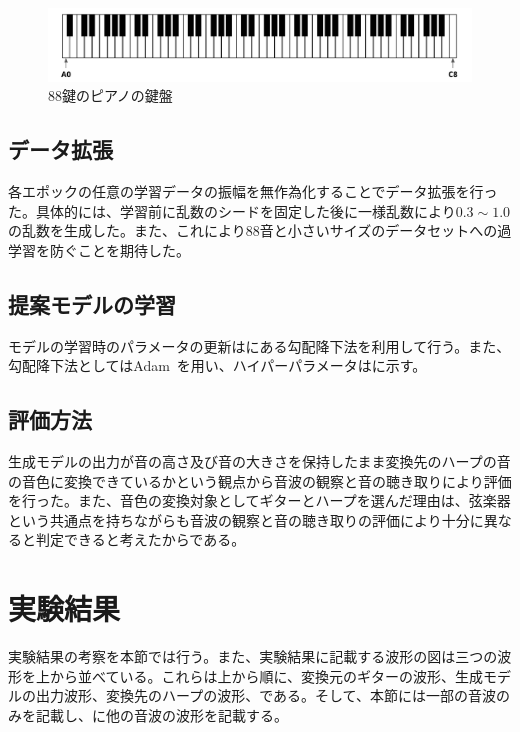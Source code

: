 \begin{figure}[b]
\centering
\includegraphics[width=0.7\columnwidth]{figure/piano.png}
\caption{88鍵のピアノの鍵盤}
\label{fig:piano}
\end{figure}

\clearpage

\subsection{データ拡張}

各エポックの任意の学習データの振幅を無作為化することでデータ拡張を行った。具体的には、学習前に乱数のシードを固定した後に一様乱数により$0.3\sim1.0$の乱数を生成した。また、これにより88音と小さいサイズのデータセットへの過学習を防ぐことを期待した。

\subsection{提案モデルの学習}

モデルの学習時のパラメータの更新はにある勾配降下法を利用して行う。また、勾配降下法としてはAdam~\cite{Adam}を用い、ハイパーパラメータはに示す。

\subsection{評価方法}

生成モデルの出力が音の高さ及び音の大きさを保持したまま変換先のハープの音の音色に変換できているかという観点から音波の観察と音の聴き取りにより評価を行った。また、音色の変換対象としてギターとハープを選んだ理由は、弦楽器という共通点を持ちながらも音波の観察と音の聴き取りの評価により十分に異なると判定できると考えたからである。

\section{実験結果}
\label{sec:result}

実験結果の考察を本節では行う。また、実験結果に記載する波形の図は三つの波形を上から並べている。これらは上から順に、変換元のギターの波形、生成モデルの出力波形、変換先のハープの波形、である。そして、本節には一部の音波のみを記載し、に他の音波の波形を記載する。

